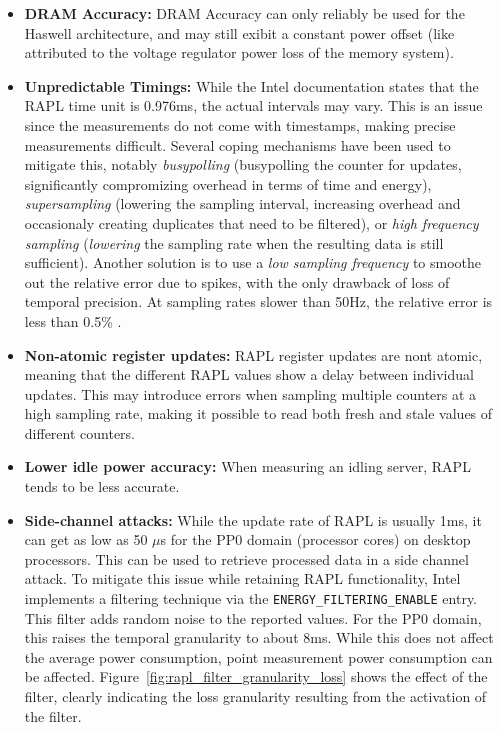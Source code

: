 \begin{itemize}
    \item \textbf{DRAM Accuracy: }DRAM Accuracy can only reliably be used for the Haswell architecture\parencite{desrochers2016validation, khan2018rapl, alt2024experimental}, and may still exibit a constant power offset (like attributed to the voltage regulator power loss of the memory system).
    \item \textbf{Unpredictable Timings: }While the Intel documentation states that the RAPL time unit is 0.976ms, the actual intervals may vary. This is an issue since the measurements do not come with timestamps, making precise measurements difficult\parencite{khan2018rapl}. Several coping mechanisms have been used to mitigate this, notably \textit{busypolling} (busypolling the counter for updates, significantly compromizing overhead in terms of time and energy\parencite{hahnel2012measuring}), \textit{supersampling} (lowering the sampling interval, increasing overhead and occasionaly creating duplicates that need to be filtered\parencite{khan2018rapl}), or \textit{high frequency sampling} (\textit{lowering} the sampling rate when the resulting data is still sufficient\parencite{servat2016detailed}). Another solution is to use a \textit{low sampling frequency} to smoothe out the relative error due to spikes, with the only drawback of loss of temporal precision. At sampling rates slower than 50Hz, the relative error is less than 0.5\% \parencite{jay2023experimental}.
    \item \textbf{Non-atomic register updates: } RAPL register updates are nont atomic\parencite{khan2018rapl}, meaning that the different RAPL values show a delay between individual updates. This may introduce errors when sampling multiple counters at a high sampling rate, making it possible to read both fresh and stale values of different counters.
    \item \textbf{Lower idle power accuracy: } When measuring an idling server, RAPL tends to be less accurate\parencite{schone2024energy, desrochers2016validation}.
    \item \textbf{Side-channel attacks: } While the update rate of RAPL is usually 1ms, it can get as low as 50 $\mu$s for the PP0 domain (processor cores) on desktop processors\parencite{schone2024energy}. This can be used to retrieve processed data in a side channel attack\parencite{lipp2021platypus, schone2024energy}. To mitigate this issue while retaining RAPL functionality, Intel implements a filtering technique via the \texttt{ENERGY\_FILTERING\_ENABLE}\parencite[Table 2-2]{intel2023} entry. This filter adds random noise to the reported values. For the PP0 domain, this raises the temporal granularity to about 8ms. While this does not affect the average power consumption, point measurement power consumption can be affected. Figure~\ref{fig:rapl_filter_granularity_loss} shows the effect of the filter, clearly indicating the loss granularity resulting from the activation of the filter.

\end{itemize}
